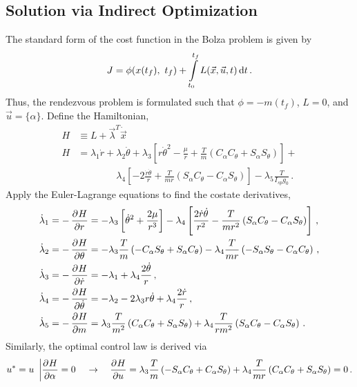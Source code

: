 \documentclass[conf]{new-aiaa}
\begin{document}
\subsection{Solution via Indirect Optimization}
The standard form of the cost function in the Bolza problem is given by
\begin{equation*}
	J = \phi(x(t_f),~t_f) + \int\limits_{t_0}^{t_f} L(\vec{x}, \vec{u}, t) \dif t\,.
\end{equation*}
Thus, the rendezvous problem is formulated such that $\phi = -m(t_f)$, $L=0$, and $\vec{u} = \{\alpha \}$. Define the Hamiltonian,
\begin{align}
	H &\equiv L + \vec{\lambda}^T \dot{\vec{x}} \nonumber\\
	H &= \lambda_1 \dot{r} + \lambda_2 \dot{\theta} + 
		\lambda_3 \left[ r \dot{\theta}^2 - \frac{\mu}{r} + \frac{T}{m} \left( C_{\alpha} C_{\theta} + S_{\alpha} S_{\theta} \right) \right] + \nonumber\\
		&\qquad\qquad \lambda_4 \left[ -2\frac{\dot{r}\dot{\theta}}{r} + \frac{T}{mr} \left( S_{\alpha} C_{\theta} - C_{\alpha} S_{\theta} \right) \right] - \lambda_5 \frac{T}{I_{sp} g_0}\,.
\end{align}
Apply the Euler-Lagrange equations to find the costate derivatives,
\begin{align}
	\dot{\lambda}_1 &= -\dpd{H}{r} = -\lambda_3\left[ \dot{\theta}^2 + \frac{2\mu}{r^3} \right] - \lambda_4 \left[ \frac{2 \dot{r}\dot{\theta}}{r^2} - \frac{T}{mr^2}\left( S_{\alpha} C_{\theta} - C_{\alpha} S_{\theta} \right) \right]\,,\\
	\dot{\lambda}_2 &= -\dpd{H}{\theta} = -\lambda_3 \frac{T}{m} \left( -C_{\alpha} S_{\theta} + S_{\alpha} C_{\theta} \right) - \lambda_4 \frac{T}{mr} \left( -S_{\alpha} S_{\theta} - C_{\alpha} C_{\theta} \right)\,,\\
	\dot{\lambda}_3 &= -\dpd{H}{\dot{r}} = -\lambda_1 + \lambda_4 \frac{2 \dot{\theta}}{r}\,,\\
	\dot{\lambda}_4 &= -\dpd{H}{\dot{\theta}} = -\lambda_2 - 2\lambda_3 r \dot{\theta} + \lambda_4 \frac{2\dot{r}}{r}\,,\\
	\dot{\lambda}_5 &= -\dpd{H}{m} = \lambda_3 \frac{T}{m^2} \left( C_{\alpha} C_{\theta} + S_{\alpha} S_{\theta} \right) + \lambda_4 \frac{T}{rm^2} \left( S_{\alpha} C_{\theta} - C_{\alpha} S_{\theta} \right)\,.
\end{align}
Similarly, the optimal control law is derived via
\begin{equation}
	u^* = u~\left| \dpd{H}{\alpha} = 0 \right. \quad \to \quad \dpd{H}{u} = \lambda_3 \frac{T}{m} \left( -S_{\alpha} C_{\theta} + C_{\alpha} S_{\theta} \right) + \lambda_4 \frac{T}{mr} \left( C_{\alpha} C_{\theta} + S_{\alpha} S_{\theta} \right) = 0\,.
	\label{eq:dHdu}
\end{equation}
\end{document}
